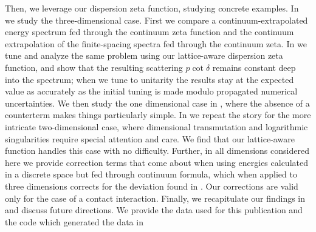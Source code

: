 Then, we leverage our dispersion zeta function, studying concrete examples.
In  we study the three-dimensional case.
First we compare a continuum-extrapolated energy spectrum fed through the continuum zeta function and the continuum extrapolation of the finite-spacing spectra fed through the continuum zeta.
In  we tune and analyze the same problem using our lattice-aware dispersion zeta function, and show that the resulting scattering $p\cot\delta$ remains constant deep into the spectrum; when we tune to unitarity the results stay at the expected value as accurately as the initial tuning is made modulo propagated numerical uncertainties.
We then study the one dimensional case in , where the absence of a counterterm makes things particularly simple.
In  we repeat the story for the more intricate two-dimensional case, where dimensional transmutation and logarithmic singularities require special attention and care.
We find that our lattice-aware \Luscher function handles this case with no difficulty.
Further, in all dimensions considered here we provide correction terms that come about when using energies calculated in a discrete space but fed through continuum \Luscher formula, which when applied to three dimensions corrects for the deviation found in .
Our corrections are valid only for the case of a contact interaction.
Finally, we recapitulate our findings in  and discuss future directions.
We provide the data used for this publication and the code which generated the data in 
